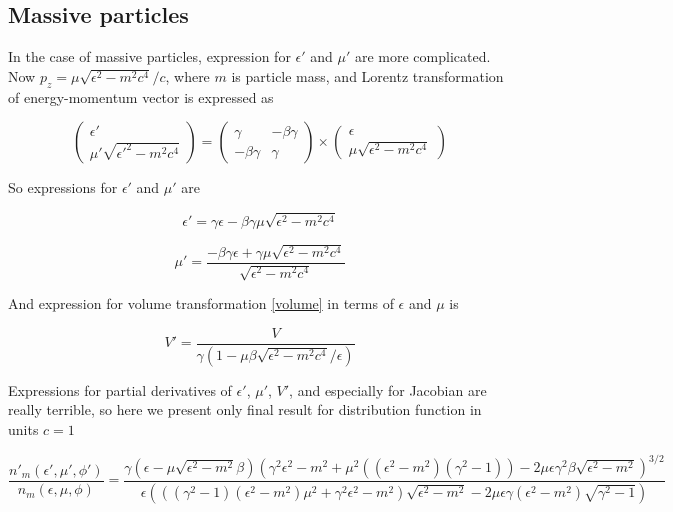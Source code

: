\subsection{Massive particles}
In the case of massive particles, expression for $\epsilon'$ and $\mu'$ are more complicated. Now $p_z = \mu \sqrt{\epsilon^2 - m^2 c^4}/c$, where $m$ is particle mass, and Lorentz transformation of energy-momentum vector is expressed as

\begin{equation}\label{lorentz_m}
	\left(\begin{array}{c}
		\epsilon'\\
		\mu'\sqrt{{\epsilon'}^2 - m^2 c^4}
	\end{array}
	\right)
	= \left(
	\begin{array}{cc}
		\gamma & -\beta\gamma\\
		-\beta\gamma & \gamma
	\end{array}
	\right)
	\times
	\left(\begin{array}{c}
		\epsilon\\
		\mu\sqrt{{\epsilon}^2-m^2 c^4}
	\end{array}
	\right)
\end{equation}

So expressions for $\epsilon'$ and $\mu'$ are

\begin{equation}
	\epsilon' = \gamma\epsilon-\beta\gamma\mu\sqrt{\epsilon^2-m^2 c^4}
\end{equation}

\begin{equation}
	\mu' = \frac{-\beta\gamma\epsilon+\gamma\mu\sqrt{{\epsilon}^2-m^2 c^4}}{\sqrt{{\epsilon^2 - m^2 c^4}}}
\end{equation}

And expression for volume transformation \ref{volume} in terms of $\epsilon$ and $\mu$ is

\begin{equation}
	V'=\frac{V}{\gamma(1-\mu\beta\sqrt{{\epsilon}^2-m^2 c^4}/\epsilon)}
\end{equation}

Expressions for partial derivatives of $\epsilon'$, $\mu'$, $V'$, and especially for Jacobian are really terrible, so here we present only final result for distribution function in units $c = 1$

\begin{equation}
		\frac{n'_{m}(\epsilon',\mu',\phi')}{n_{m}(\epsilon,\mu,\phi)}= \frac{\gamma(\epsilon-\mu\sqrt{{\epsilon}^2-m^2}\beta)(\gamma^2\epsilon^2-m^2 + \mu^2 ((\epsilon^2-m^2)(\gamma^2-1)) - 2\mu\epsilon\gamma^2\beta\sqrt{\epsilon^2-m^2})^{3/2}}{\epsilon(((\gamma^2-1)(\epsilon^2-m^2)\mu^2 + \gamma^2\epsilon^2 - m^2)\sqrt{\epsilon^2-m^2}-2\mu\epsilon\gamma(\epsilon^2 - m^2)\sqrt{\gamma^2 - 1})}
\end{equation}

